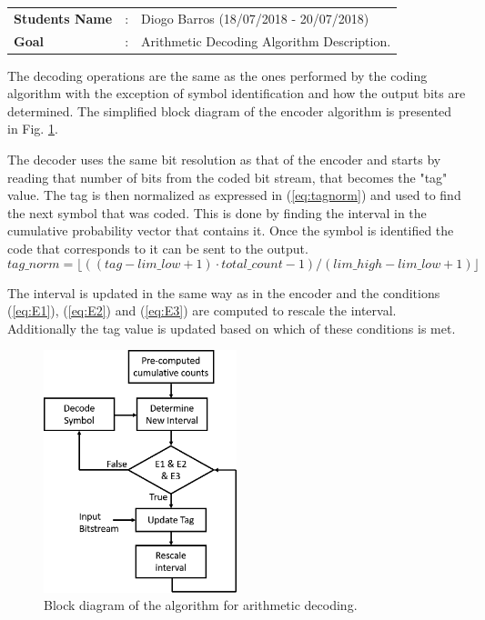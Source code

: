 \begin{refsection}
\begin{tcolorbox}	
\begin{tabular}{p{2.75cm} p{0.2cm} p{10.5cm}} 	
\textbf{Students Name}  &:& Diogo Barros (18/07/2018 - 20/07/2018) \\
\textbf{Goal}          &:& Arithmetic Decoding Algorithm Description.
\end{tabular}
\end{tcolorbox}

The decoding operations are the same as the ones performed by the coding algorithm with the exception of symbol identification and how the output bits are determined. The simplified block diagram of the encoder algorithm is presented in Fig. \ref{fig:arithDecBlockDiagr}.

The decoder uses the same bit resolution as that of the encoder and starts by reading that number of bits from the coded bit stream, that becomes the "tag" value. The tag is then normalized as expressed in (\ref{eq:tagnorm}) and used to find the next symbol that was coded. This is done by finding the interval in the cumulative probability vector that contains it. Once the symbol is identified the code that corresponds to it can be sent to the output.
\begin{equation} \label{eq:tagnorm}
tag\_norm = \lfloor((tag - lim\_low + 1) \cdot total\_count - 1) / (lim\_high - lim\_low + 1)\rfloor
\end{equation}

The interval is updated in the same way as in the encoder and the conditions (\ref{eq:E1}), (\ref{eq:E2}) and (\ref{eq:E3}) are computed to rescale the interval. Additionally the tag value is updated based on which of these conditions is met. 

\begin{figure}[H]
	\centering
	\includegraphics[width=0.5\textwidth]{./sdf/eit_46084_arithmetic_encoder_decoder/figures/ArithDecoderBlockDiagram.png}
	\caption{Block diagram of the algorithm for arithmetic decoding.} \label{fig:arithDecBlockDiagr}
\end{figure}


\end{refsection}

